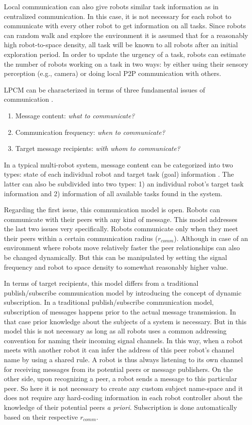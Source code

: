 Local communication can also give robots similar task information as in centralized communication. In this case, it is not necessary for each robot to communicate with every other robot to get information on all tasks. Since robots can random walk and explore the environment it is assumed that for a reasonably high robot-to-space density, all task will be known to all robots after an initial exploration period. In order to update the urgency of a task, robots can estimate the number of robots working on a task in two ways:  by either using their sensory perception (e.g., camera) or  doing local P2P communication with others.

LPCM can be  characterized  in terms of three fundamental issues of communication \cite{Gerkey+2001}. 
\begin{enumerate}
\item Message content: {\em what to communicate?}
\item Communication frequency: {\em when to communicate?}
\item Target message recipients: {\em with whom to communicate?}
\end{enumerate}
In a typical multi-robot system, message content can be categorized into two types: state of each individual robot and target task (goal) information \cite{Balch2005}. The latter can also be subdivided into two types: 1) an individual robot's target task information and 2) information of all available tasks found in the system.

Regarding the first issue, this communication model is open. Robots can communicate with their peers with any kind of message. This model addresses the last two issues very specifically. Robots communicate only when they meet their peers within a certain communication radius ($r_{comm}$). Although in case of an environment where robots move relatively faster the peer relationships can also be changed dynamically. But this can be manipulated by setting the signal frequency and robot to space density to somewhat reasonably higher value.

In terms of target recipients, this model differs from a traditional publish/subscribe communication model by introducing the concept of dynamic subscription. In a traditional publish/subscribe communication model, subscription of messages happens prior to the actual message transmission. In that case prior knowledge about the subjects of a system is necessary. But in this model this is not necessary as long as all robots uses a common addressing convention for naming their incoming signal channels. In this way, when a robot meets with another robot it can infer the address of this peer robot's channel name by using a shared rule. A robot is thus always listening to its own channel for receiving messages from its potential peers or message publishers. On the other side, upon recognizing a peer, a robot sends a message to this particular peer. So here it is not necessary to create any custom subject name-space  \cite{Gerkey+2001} and it does  not require  any hard-coding information in each robot controller about the knowledge of their potential peers {\em a priori}. Subscription is done automatically based on their respective $r_{comm}$.
%

